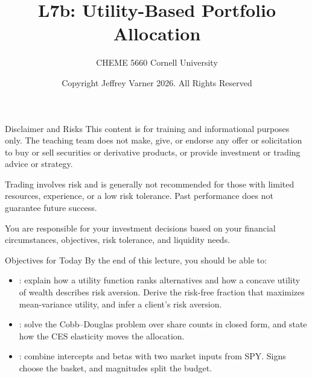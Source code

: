 \documentclass[aspectratio=169,11pt]{beamer}
\title{\texorpdfstring{{\vnheavy L7b}}{L7b}: Utility-Based Portfolio Allocation}
\subtitle{CHEME 5660 Cornell University}
\author{Copyright Jeffrey Varner 2026. All Rights Reserved}
\begin{document}
\vntitlepage

\begin{frame}{Disclaimer and Risks}
  \vspace{0.6em}
  \textbf{} This content is for training and informational
  purposes only. The teaching team does not make, give, or endorse any offer or
  solicitation to buy or sell securities or derivative products, or provide
  investment or trading advice or strategy.

  \vspace{1.1em}
  \textbf{} Trading involves risk and is generally not recommended for
  those with limited resources, experience, or a low risk tolerance. Past
  performance does not guarantee future success.

  \vspace{1.1em}
  \textbf{} You are responsible for your investment decisions
  based on your financial circumstances, objectives, risk tolerance, and
  liquidity needs.
\end{frame}

\begin{frame}{Objectives for Today}
By the end of this lecture, you should be able to:
\begin{itemize}\setlength{\itemsep}{0.9em}
\item {}: explain how a utility
function ranks alternatives and how a concave utility of wealth describes risk
aversion. Derive the risk-free fraction that maximizes mean-variance utility, and
infer a client's risk aversion.
\item {}: solve the Cobb--Douglas
problem over share counts in closed form, and state how the CES elasticity moves
the allocation.
\item {}: combine
intercepts and betas with two market inputs from SPY. Signs choose the basket,
and magnitudes split the budget.
\end{itemize}
\end{frame}
\end{document}
